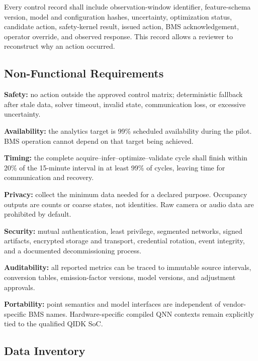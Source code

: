 Every control record shall include observation-window identifier, feature-schema version, model and configuration hashes, uncertainty, optimization status, candidate action, safety-kernel result, issued action, BMS acknowledgement, operator override, and observed response. This record allows a reviewer to reconstruct why an action occurred.

\subsection{Non-Functional Requirements}

\textbf{Safety:} no action outside the approved control matrix; deterministic fallback after stale data, solver timeout, invalid state, communication loss, or excessive uncertainty.

\textbf{Availability:} the analytics target is 99\% scheduled availability during the pilot. BMS operation cannot depend on that target being achieved.

\textbf{Timing:} the complete acquire--infer--optimize--validate cycle shall finish within 20\% of the 15-minute interval in at least 99\% of cycles, leaving time for communication and recovery.

\textbf{Privacy:} collect the minimum data needed for a declared purpose. Occupancy outputs are counts or coarse states, not identities. Raw camera or audio data are prohibited by default.

\textbf{Security:} mutual authentication, least privilege, segmented networks, signed artifacts, encrypted storage and transport, credential rotation, event integrity, and a documented decommissioning process.

\textbf{Auditability:} all reported metrics can be traced to immutable source intervals, conversion tables, emission-factor versions, model versions, and adjustment approvals.

\textbf{Portability:} point semantics and model interfaces are independent of vendor-specific BMS names. Hardware-specific compiled QNN contexts remain explicitly tied to the qualified QIDK SoC.

\subsection{Data Inventory}

